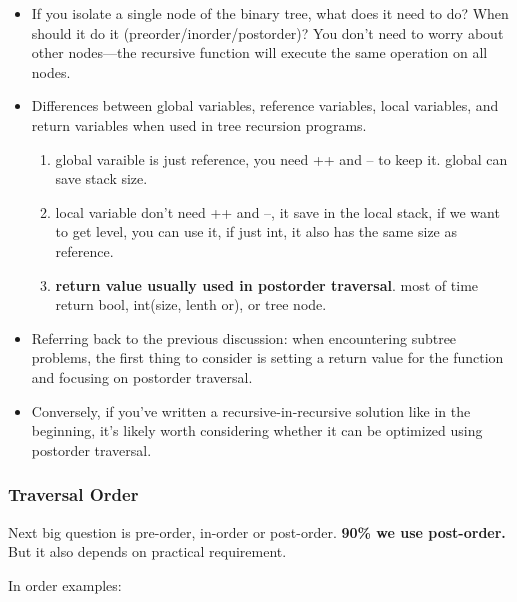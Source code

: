 \documentclass[a4paper,11pt,twoside]{book}
\begin{document}
\begin{itemize}

	\item If you isolate a single node of the binary tree, what does it need to do? When should it do it (preorder/inorder/postorder)? You don’t need to worry about other nodes—the recursive function will execute the same operation on all nodes.
	
	\item Differences between global variables, reference variables, local variables, and return variables when used in tree recursion programs.
	\begin{enumerate}
		\item global varaible is just reference, you need ++ and -- to keep it. global can save stack size. 
		
		\item local variable don't need ++ and --, it save in the local stack, if we want to get level, you can use it, if just int, it also has the same size as reference. 
		
		\item \textbf{return value usually used in postorder traversal}. most of time return bool, int(size, lenth or), or tree node. 
	\end{enumerate}

	\item Referring back to the previous discussion: when encountering subtree problems, the first thing to consider is setting a return value for the function and focusing on postorder traversal.

	\item Conversely, if you’ve written a recursive-in-recursive solution like in the beginning, it’s likely worth considering whether it can be optimized using postorder traversal.

\end{itemize}



\subsubsection{Traversal Order}

\par Next big question is pre-order, in-order or post-order. \textbf{90\% we use post-order.} But it also depends on practical requirement.

\par In order examples:
\end{document}
